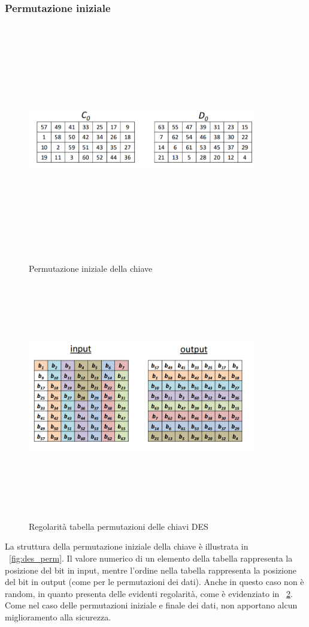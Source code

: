 \subsubsection{Permutazione iniziale}
\begin{figure}[htbp]
	\centering%
	\subfigure%
	{\includegraphics[height=10cm, width=10cm, keepaspectratio]{Immagini/Capitolo2/des_perm_keys.png}}
	\caption{Permutazione iniziale della chiave \label{fig:des_perm_keys}} 	
\end{figure}
\begin{figure}[htbp]
	\centering%
	\subfigure%
	{\includegraphics[height=10cm, width=10cm, keepaspectratio]{Immagini/Capitolo2/des_perm_keys_2.png}}
	\caption{Regolarità tabella permutazioni delle chiavi DES \label{fig:des_perm_keys_2}} 	
\end{figure}
La struttura della permutazione iniziale della chiave è illustrata in \figurename ~\ref{fig:des_perm}. Il valore numerico di un elemento della tabella rappresenta la posizione del bit in input, mentre l’ordine nella tabella rappresenta la posizione del bit in output (come per le permutazioni dei dati). Anche in questo caso non è random, in quanto presenta delle evidenti regolarità, come è evidenziato in \figurename ~\ref{fig:des_perm_keys_2}. Come nel caso delle permutazioni iniziale e finale dei dati, non apportano alcun miglioramento alla sicurezza.
\newpage
